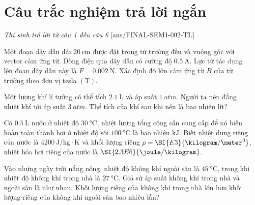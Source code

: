 \section{Câu trắc nghiệm trả lời ngắn} \textit{Thí sinh trả lời từ câu 1 đến câu 6}
\setcounter{ex}{0}
[ans/FINAL-SEM1-002-TL]
\begin{ex}
	Một đoạn dây dẫn dài $\SI{20}{\centi\meter}$ được đặt trong từ trường đều và vuông góc với vector cảm ứng từ. Dòng điện qua dây dẫn có cường độ $\SI{0.5}{\ampere}$. Lực từ tác dụng lên đoạn dây dẫn này là  $F=\SI{0.002}{\newton}$. Xác định độ lớn cảm ứng từ $B$ của từ trường theo đơn vị tesla $\left(\si{\tesla}\right)$.
\end{ex}
\begin{ex}
	Một lượng khí lí tưởng có thể tích $\SI{2.1}{\liter}$ và áp suất $\SI{1}{atm}$. Người ta nén đẳng nhiệt khí tới áp suất $\SI{3}{atm}$. Thể tích của khí sau khi nén là bao nhiêu lít?
\end{ex}
\begin{ex}
	Có $\SI{0.5}{\liter}$ nước ở nhiệt độ $\SI{30}{\celsius}$, nhiệt lượng tổng cộng cần cung cấp để nó biến hoàn toàn thành hơi ở nhiệt độ sôi $\SI{100}{\celsius}$ là bao nhiêu $\si{\kilo\joule}$. Biết nhiệt dung riêng của nước là $\SI{4200}{\joule/\kilogram\cdot\kelvin}$ và khối lượng riêng $\rho=\SI{E3}{\kilogram/\meter^3}$, nhiệt hóa hơi riêng của nước là $\SI{2.3E6}{\joule/\kilogram}$.
\end{ex}
\begin{ex}
	Vào những ngày trời nắng nóng, nhiệt độ không khí ngoài sân là $\SI{45}{\celsius}$, trong khi nhiệt độ không khí trong nhà là $\SI{27}{\celsius}$. Giả sử áp suất không khí trong nhà và ngoài sân là như nhau. Khối lượng riêng của không khí trong nhà lớn hơn khối lượng riêng của không khí ngoài sân bao nhiêu lần?
\end{ex}

